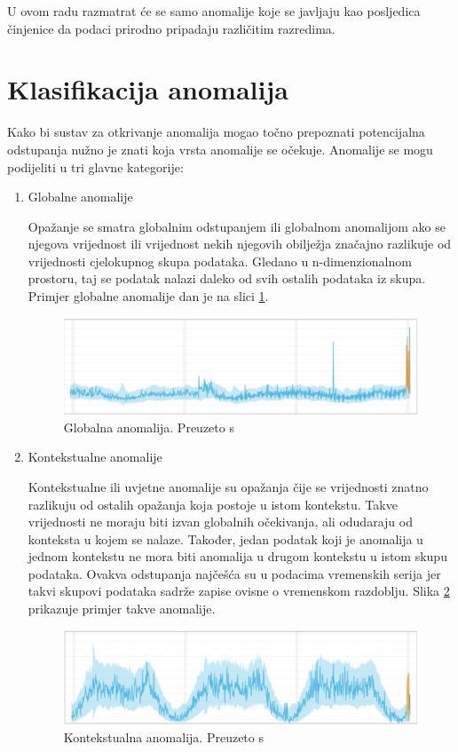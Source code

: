 \documentclass[utf8, diplomski, numeric]{fer}
\begin{document}
U ovom radu razmatrat će se samo anomalije koje se javljaju kao posljedica činjenice da podaci prirodno pripadaju različitim razredima.

\section{Klasifikacija anomalija}
Kako bi sustav za otkrivanje anomalija mogao točno prepoznati potencijalna odstupanja nužno je znati koja vrsta anomalije se očekuje. Anomalije se mogu podijeliti u tri glavne kategorije:

\begin{enumerate}
\item Globalne anomalije

Opažanje se smatra globalnim odstupanjem ili globalnom anomalijom ako se njegova vrijednost ili vrijednost nekih njegovih obilježja značajno razlikuje od vrijednosti cjelokupnog skupa podataka. Gledano u n-dimenzionalnom prostoru, taj se podatak nalazi daleko od svih ostalih podataka iz skupa. Primjer globalne anomalije dan je na slici \ref{fig:outlier1}.

\begin{figure}[htb]
\includegraphics[width=1\textwidth]{images/outlier_type1.png}
\centering
\caption{Globalna anomalija. Preuzeto s  \cite{OutlierAnalysis}}
\label{fig:outlier1}
\end{figure}

\item Kontekstualne anomalije

Kontekstualne ili uvjetne anomalije su opažanja čije se vrijednosti znatno razlikuju od ostalih opažanja koja postoje u istom kontekstu. Takve vrijednosti ne moraju biti izvan globalnih očekivanja, ali odudaraju od konteksta u kojem se nalaze. Također, jedan podatak koji je anomalija u jednom kontekstu ne mora biti anomalija u drugom kontekstu u istom skupu podataka. Ovakva odstupanja najčešća su u podacima vremenskih serija jer takvi skupovi podataka sadrže zapise ovisne o vremenskom razdoblju. Slika \ref{fig:outlier2} prikazuje primjer takve anomalije.

\begin{figure}[htb]
\includegraphics[width=1\textwidth]{images/outlier_type2.png}
\centering
\caption{Kontekstualna anomalija. Preuzeto s  \cite{OutlierAnalysis}}
\label{fig:outlier2}
\end{figure}


\end{enumerate}
\end{document}
